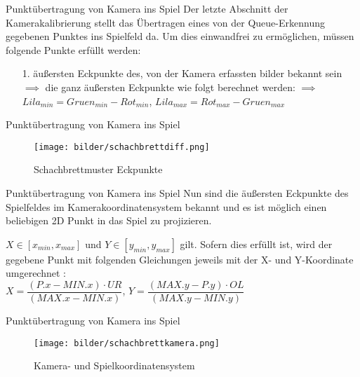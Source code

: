 
\begin{frame}{Punktübertragung von Kamera ins Spiel}
	Der letzte Abschnitt der Kamerakalibrierung stellt das Übertragen eines von der Queue-Erkennung gegebenen Punktes ins Spielfeld da. Um dies einwandfrei zu ermöglichen, müssen folgende Punkte erfüllt werden:
	\begin{itemize}
		\item[1.] äußersten Eckpunkte des, von der Kamera erfassten bilder bekannt sein\\
		$\implies$ die ganz äußersten Eckpunkte wie folgt berechnet werden:
		$\implies$ $Lila_{min} = Gruen_{min} - Rot_{min}$, $Lila_{max} = Rot_{max} - Gruen_{max}$
		\pause
	\end{itemize}	
\end{frame}

\begin{frame}{Punktübertragung von Kamera ins Spiel}
		\begin{figure}[h]
		\centering
		\texttt{[image: bilder/schachbrettdiff.png]}
		\caption{Schachbrettmuster Eckpunkte}
	\end{figure}
\end{frame}

\begin{frame}{Punktübertragung von Kamera ins Spiel}
	Nun sind die äußersten Eckpunkte des Spielfeldes im Kamerakoordinatensystem bekannt und es ist möglich einen beliebigen 2D Punkt in das Spiel zu projizieren.
	
	$X \in [x_{min}, x_{max}]$ und $Y \in [y_{min},y_{max}]$ gilt.
	Sofern dies erfüllt ist, wird der gegebene Punkt mit folgenden Gleichungen jeweils mit der X- und Y-Koordinate umgerechnet :\\
	$X = \dfrac{(P.x - MIN.x) \cdot UR}{(MAX.x - MIN.x)}$, 
	$Y = \dfrac{(MAX.y - P.y) \cdot OL}{(MAX.y - MIN.y)}$
	
\end{frame}

\begin{frame}{Punktübertragung von Kamera ins Spiel}
	\begin{figure}[h]
		\centering
		\texttt{[image: bilder/schachbrettkamera.png]}
		\caption{Kamera- und Spielkoordinatensystem}
	\end{figure}
\end{frame}